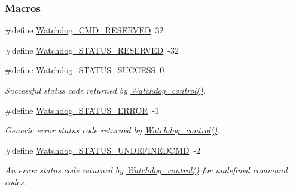 \subsubsection*{Macros}
\begin{DoxyCompactItemize}
\item 
\#define \hyperlink{group___watchdog___c_o_n_t_r_o_l_ga4d1b16e67bf555b8fe49182eb8a28b97}{Watchdog\+\_\+\+C\+M\+D\+\_\+\+R\+E\+S\+E\+R\+V\+E\+D}~32
\item 
\#define \hyperlink{group___watchdog___c_o_n_t_r_o_l_gaf7d1273929fd4d1f630c31b90def9684}{Watchdog\+\_\+\+S\+T\+A\+T\+U\+S\+\_\+\+R\+E\+S\+E\+R\+V\+E\+D}~-\/32
\item 
\#define \hyperlink{group___watchdog___s_t_a_t_u_s_gaa8dd490de97398b1da33798d8e54b53f}{Watchdog\+\_\+\+S\+T\+A\+T\+U\+S\+\_\+\+S\+U\+C\+C\+E\+S\+S}~0
\begin{DoxyCompactList}\small\item\em Successful status code returned by \hyperlink{_watchdog_8h_aa98a75361edb1e476432669169f2950e}{Watchdog\+\_\+control()}. \end{DoxyCompactList}\item 
\#define \hyperlink{group___watchdog___s_t_a_t_u_s_ga7cc28c1119ebecae88a5ae0735228489}{Watchdog\+\_\+\+S\+T\+A\+T\+U\+S\+\_\+\+E\+R\+R\+O\+R}~-\/1
\begin{DoxyCompactList}\small\item\em Generic error status code returned by \hyperlink{_watchdog_8h_aa98a75361edb1e476432669169f2950e}{Watchdog\+\_\+control()}. \end{DoxyCompactList}\item 
\#define \hyperlink{group___watchdog___s_t_a_t_u_s_ga589be79a7f8ce642863f231e1dae7577}{Watchdog\+\_\+\+S\+T\+A\+T\+U\+S\+\_\+\+U\+N\+D\+E\+F\+I\+N\+E\+D\+C\+M\+D}~-\/2
\begin{DoxyCompactList}\small\item\em An error status code returned by \hyperlink{_watchdog_8h_aa98a75361edb1e476432669169f2950e}{Watchdog\+\_\+control()} for undefined command codes. \end{DoxyCompactList}\end{DoxyCompactItemize}
